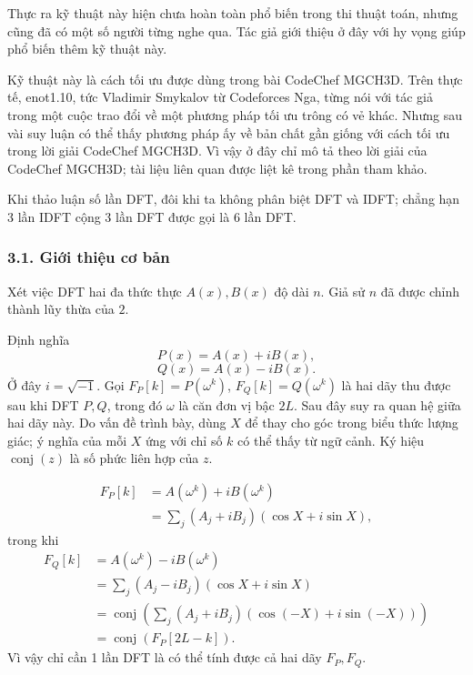 \documentclass[11pt]{article}
\begin{document}
Thực ra kỹ thuật này hiện chưa hoàn toàn phổ biến trong thi thuật toán, nhưng
cũng đã có một số người từng nghe qua. Tác giả giới thiệu ở đây với hy vọng
giúp phổ biến thêm kỹ thuật này.

Kỹ thuật này là cách tối ưu được dùng trong bài CodeChef MGCH3D. Trên thực tế,
enot1.10, tức Vladimir Smykalov từ Codeforces Nga, từng nói với tác giả trong
một cuộc trao đổi về một phương pháp tối ưu trông có vẻ khác. Nhưng sau vài
suy luận có thể thấy phương pháp ấy về bản chất gần giống với cách tối ưu
trong lời giải CodeChef MGCH3D. Vì vậy ở đây chỉ mô tả theo lời giải của
CodeChef MGCH3D; tài liệu liên quan được liệt kê trong phần tham khảo.

Khi thảo luận số lần DFT, đôi khi ta không phân biệt DFT và IDFT; chẳng hạn
3 lần IDFT cộng 3 lần DFT được gọi là 6 lần DFT.

\subsubsection*{3.1. Giới thiệu cơ bản}

Xét việc DFT hai đa thức thực \(A(x),B(x)\) độ dài \(n\). Giả sử \(n\) đã được
chỉnh thành lũy thừa của \(2\).

Định nghĩa
\[
  P(x)=A(x)+iB(x), \tag{3.1}
\]
\[
  Q(x)=A(x)-iB(x). \tag{3.2}
\]
Ở đây \(i=\sqrt{-1}\). Gọi \(F_P[k]=P(\omega^k)\), \(F_Q[k]=Q(\omega^k)\) là
hai dãy thu được sau khi DFT \(P,Q\), trong đó \(\omega\) là căn đơn vị bậc
\(2L\). Sau đây suy ra quan hệ giữa hai dãy này. Do vấn đề trình bày, dùng
\(X\) để thay cho góc trong biểu thức lượng giác; ý nghĩa của mỗi \(X\) ứng
với chỉ số \(k\) có thể thấy từ ngữ cảnh. Ký hiệu \(\operatorname{conj}(z)\)
là số phức liên hợp của \(z\).

\[
\begin{aligned}
F_P[k]
  &= A(\omega^k)+iB(\omega^k)\\
  &= \sum_j (A_j+iB_j)(\cos X+i\sin X),
\end{aligned}
\]
trong khi
\[
\begin{aligned}
F_Q[k]
  &= A(\omega^k)-iB(\omega^k)\\
  &= \sum_j(A_j-iB_j)(\cos X+i\sin X)\\
  &= \operatorname{conj}\left(
      \sum_j(A_j+iB_j)(\cos(-X)+i\sin(-X))
     \right)\\
  &= \operatorname{conj}(F_P[2L-k]).
\end{aligned}
\]
Vì vậy chỉ cần 1 lần DFT là có thể tính được cả hai dãy \(F_P,F_Q\).
\end{document}
